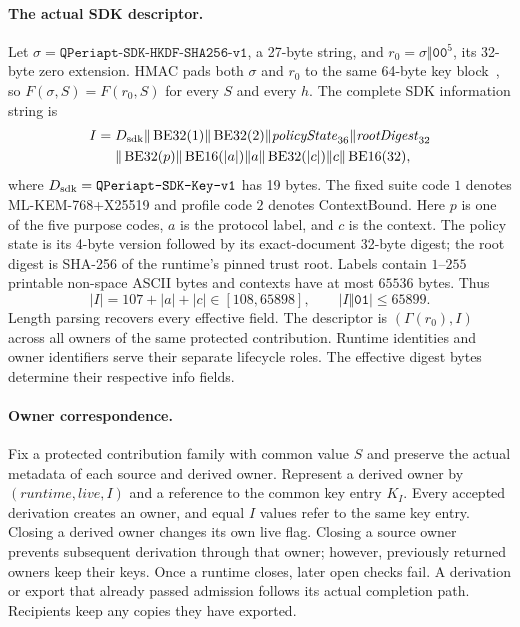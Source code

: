 \paragraph{The actual SDK descriptor.}
Let $\sigma=\texttt{QPeriapt-SDK-HKDF-SHA256-v1}$, a 27-byte string, and
$r_0=\sigma\Vert\mathtt{00}^5$, its 32-byte zero extension. HMAC pads both $\sigma$ and $r_0$ to the same
64-byte key block~\cite{rfc2104}, so $F(\sigma,S)=F(r_0,S)$ for every $S$ and every $h$.
The complete SDK information string is
\begin{equation}
\begin{split}
 I={}&D_{\rm sdk}\Vert\operatorname{BE32}(1)
 \Vert\operatorname{BE32}(2)\Vert\mathit{policyState}_{36}
 \Vert\mathit{rootDigest}_{32}\\
 &\Vert\operatorname{BE32}(p)
 \Vert\operatorname{BE16}(|a|)\Vert a
 \Vert\operatorname{BE32}(|c|)\Vert c
 \Vert\operatorname{BE16}(32),
\end{split}
 \label{eq:sdk-purpose-info}
\end{equation}
where $D_{\rm sdk}=\texttt{QPeriapt-SDK-Key-v1}$ has 19 bytes. The fixed
suite code $1$ denotes ML-KEM-768+X25519 and profile code $2$ denotes
ContextBound. Here $p$ is one
of the five purpose codes, $a$ is the protocol label, and $c$ is the context.
The policy state is its 4-byte version followed by its exact-document
32-byte digest; the root digest is SHA-256 of the runtime's pinned trust
root. Labels contain $1$--$255$ printable non-space ASCII bytes and contexts
have at most $65536$ bytes. Thus
\[
 |I|=107+|a|+|c|\in[108,65898],\qquad |I\Vert\mathtt{01}|\le65899.
\]
Length parsing recovers every effective field. The descriptor is
$(\Gamma(r_0),I)$ across all owners of the same protected contribution.
Runtime identities and owner identifiers serve their separate lifecycle
roles. The effective digest bytes determine their respective info fields.

\paragraph{Owner correspondence.}
Fix a protected contribution family with common value $S$ and preserve the
actual metadata of each source and derived owner. Represent a derived owner
by $(\mathit{runtime},\mathit{live},I)$ and a reference to the common key
entry $K_I$. Every accepted derivation creates an owner, and equal $I$ values refer
to the same key entry. Closing a derived owner changes its own live
flag. Closing a source owner prevents subsequent derivation through
that owner; however, previously returned owners keep their keys. Once a
runtime closes, later open checks fail. A derivation or export that
already passed admission follows its actual completion path. Recipients
keep any copies they have exported.

